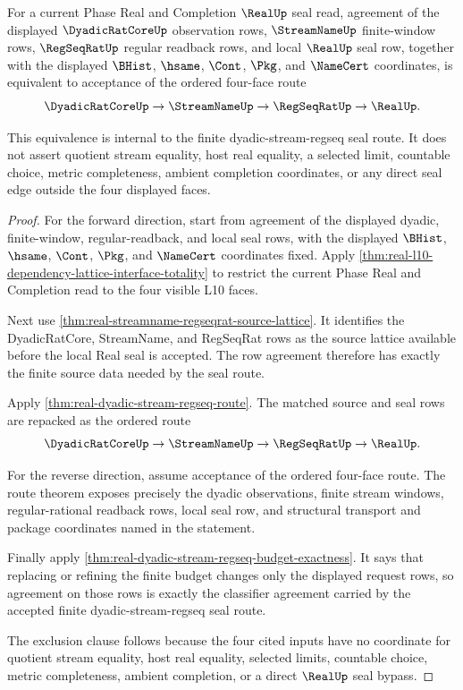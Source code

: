 \begin{theorem}
\label{thm:real-dyadic-stream-regseq-seal-equivalence}
For a current Phase Real and Completion $\RealUp$ seal read, agreement of the
displayed $\DyadicRatCoreUp$ observation rows, $\StreamNameUp$ finite-window
rows, $\RegSeqRatUp$ regular readback rows, and local $\RealUp$ seal row,
together with the displayed $\BHist$, $\hsame$, $\Cont$, $\Pkg$, and
$\NameCert$ coordinates, is equivalent to acceptance of the ordered four-face
route
$$
\DyadicRatCoreUp \to \StreamNameUp \to \RegSeqRatUp \to \RealUp .
$$

This equivalence is internal to the finite dyadic-stream-regseq seal route. It
does not assert quotient stream equality, host real equality, a selected
limit, countable choice, metric completeness, ambient completion coordinates,
or any direct seal edge outside the four displayed faces.
\end{theorem}
\begin{proof}
For the forward direction, start from agreement of the displayed dyadic,
finite-window, regular-readback, and local seal rows, with the displayed
$\BHist$, $\hsame$, $\Cont$, $\Pkg$, and $\NameCert$ coordinates fixed. Apply
\autoref{thm:real-l10-dependency-lattice-interface-totality} to restrict the
current Phase Real and Completion read to the four visible L10 faces.

Next use \autoref{thm:real-streamname-regseqrat-source-lattice}. It identifies
the DyadicRatCore, StreamName, and RegSeqRat rows as the source lattice
available before the local Real seal is accepted. The row agreement therefore
has exactly the finite source data needed by the seal route.

Apply \autoref{thm:real-dyadic-stream-regseq-route}. The matched source and
seal rows are repacked as the ordered route
$$
\DyadicRatCoreUp \to \StreamNameUp \to \RegSeqRatUp \to \RealUp .
$$

For the reverse direction, assume acceptance of the ordered four-face route.
The route theorem exposes precisely the dyadic observations, finite stream
windows, regular-rational readback rows, local seal row, and structural
transport and package coordinates named in the statement.

Finally apply
\autoref{thm:real-dyadic-stream-regseq-budget-exactness}. It says that
replacing or refining the finite budget changes only the displayed request
rows, so agreement on those rows is exactly the classifier agreement carried
by the accepted finite dyadic-stream-regseq seal route.

The exclusion clause follows because the four cited inputs have no coordinate
for quotient stream equality, host real equality, selected limits, countable
choice, metric completeness, ambient completion, or a direct $\RealUp$ seal
bypass.
\end{proof}

